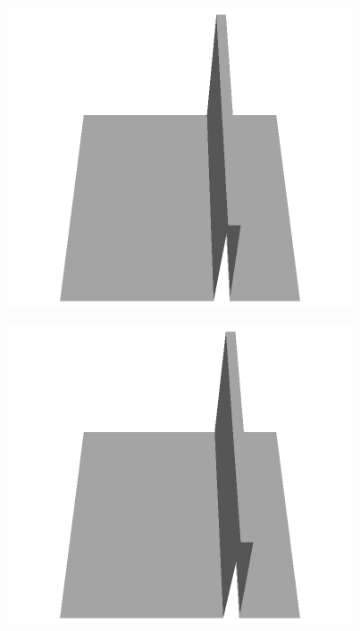 \documentclass[../document.tex]{subfiles}
\begin{document}
\begin{figure}
\begin{subfigure}[b]{0.160\textwidth}
    \end{subfigure}
    \begin{subfigure}[b]{0.160\textwidth}
    \includegraphics[width=\linewidth]{../img/5/custom_patches/walls_front/all/45-3d.png}
    \end{subfigure}
    \begin{subfigure}[b]{0.160\textwidth}
    \includegraphics[width=\linewidth]{../img/5/custom_patches/walls_front/all/40-3d.png}
    \end{subfigure}

\end{figure}
\end{document}
